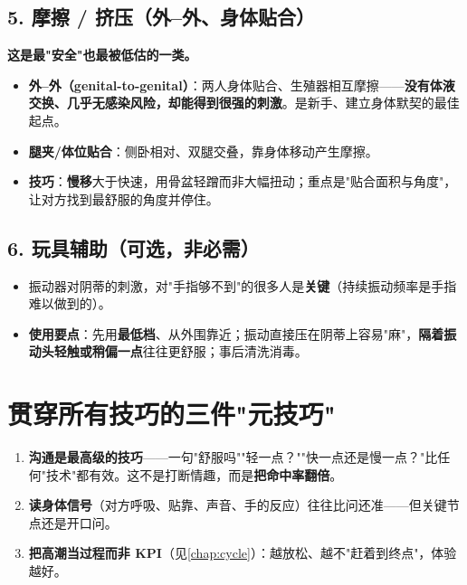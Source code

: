 \documentclass[12pt,UTF8,openany]{ctexbook}
\begin{document}
\subsection*{5. 摩擦 / 挤压（外--外、身体贴合）}

\textbf{这是最"安全"也最被低估的一类。}

\begin{itemize}[leftmargin=2em,itemsep=0.3em]
  \item \textbf{外--外（genital-to-genital）}：两人身体贴合、生殖器相互摩擦——\textbf{没有体液交换、几乎无感染风险，却能得到很强的刺激}。是新手、建立身体默契的最佳起点。
  \item \textbf{腿夹/体位贴合}：侧卧相对、双腿交叠，靠身体移动产生摩擦。
  \item \textbf{技巧}：\textbf{慢移}大于快速，用骨盆轻蹭而非大幅扭动；重点是"贴合面积与角度"，让对方找到最舒服的角度并停住。
\end{itemize}

\subsection*{6. 玩具辅助（可选，非必需）}

\begin{itemize}[leftmargin=2em,itemsep=0.3em]
  \item 振动器对阴蒂的刺激，对"手指够不到"的很多人是\textbf{关键}（持续振动频率是手指难以做到的）。
  \item \textbf{使用要点}：先用\textbf{最低档}、从外围靠近；振动直接压在阴蒂上容易"麻"，\textbf{隔着振动头轻触或稍偏一点}往往更舒服；事后清洗消毒。
\end{itemize}

\section{贯穿所有技巧的三件"元技巧"}

\begin{enumerate}[leftmargin=2em,itemsep=0.3em]
  \item \textbf{沟通是最高级的技巧}——一句"舒服吗""轻一点？""快一点还是慢一点？"比任何"技术"都有效。这不是打断情趣，而是\textbf{把命中率翻倍}。
  \item \textbf{读身体信号}（对方呼吸、贴靠、声音、手的反应）往往比问还准——但关键节点还是开口问。
  \item \textbf{把高潮当过程而非 KPI}（见\ref{chap:cycle}）：越放松、越不"赶着到终点"，体验越好。
\end{enumerate}
\end{document}
